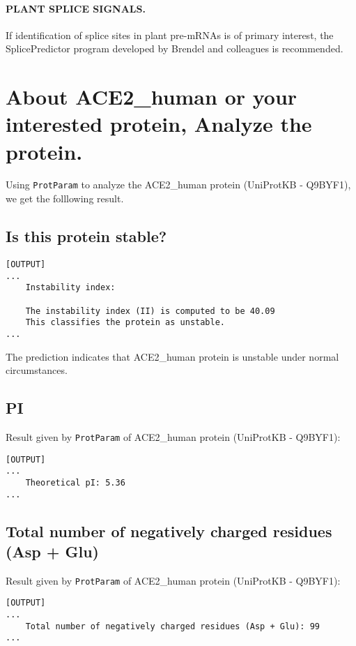 \documentclass[en,black,10pt,normal]{elegantnote}
\newcommand{\upcite}[1]{\textsuperscript{\textsuperscript{\cite{#1}}}}
\begin{document}
\paragraph{PLANT SPLICE SIGNALS.} If identification of splice sites in plant pre-mRNAs is of primary interest, the SplicePredictor program developed by Brendel and colleagues is recommended.

\section{About ACE2\_human or your interested protein, Analyze the protein.}

Using \texttt{ProtParam}\upcite{gasteiger2005protein} to analyze the ACE2\_human protein (UniProtKB - Q9BYF1),
we get the folllowing result.

\subsection{Is this protein stable?}

\begin{lstlisting}[frame=single]
[OUTPUT]
...
    Instability index:

    The instability index (II) is computed to be 40.09
    This classifies the protein as unstable.
...
\end{lstlisting}

The prediction indicates that ACE2\_human protein is unstable under normal circumstances.
\subsection{PI}
Result given by \texttt{ProtParam}\upcite{gasteiger2005protein} of ACE2\_human protein (UniProtKB - Q9BYF1):

\begin{lstlisting}[frame=single]
[OUTPUT]
...
    Theoretical pI: 5.36
...
\end{lstlisting}
\subsection{Total number of negatively charged residues (Asp + Glu)}
Result given by \texttt{ProtParam}\upcite{gasteiger2005protein} of ACE2\_human protein (UniProtKB - Q9BYF1):

\begin{lstlisting}[frame=single]
[OUTPUT]
...
    Total number of negatively charged residues (Asp + Glu): 99
...
\end{lstlisting}
\end{document}
